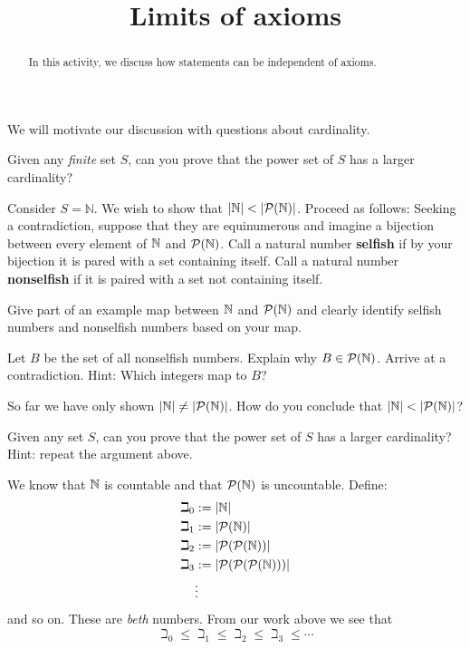 \documentclass[nooutcomes]{ximera}
\title{Limits of axioms}
\begin{document}
\begin{abstract}
In this activity, we discuss how statements can be independent of axioms.
\end{abstract}
\maketitle 

We will motivate our discussion with questions about cardinality.

\begin{question}
Given any \textit{finite} set $S$, can you prove that the power set of
$S$ has a larger cardinality?
\end{question}

Consider $S=\mathbb{N}$. We wish to show that $|\N|<|\P(\N)|$. Proceed as
follows: Seeking a contradiction, suppose that they are equinumerous
and imagine a bijection between every element of $\mathbb N$ and
$\mathcal{P}(\mathbb N)$. Call a natural number \textbf{selfish} if by your bijection
it is pared with a set containing itself. Call a natural number
\textbf{nonselfish} if it is paired with a set not containing itself.

\begin{question}
Give part of an example map between $\mathbb N$ and $\mathcal{P}(\mathbb N)$ and clearly
identify selfish numbers and nonselfish numbers based on your map.
\end{question}

\begin{question}
Let $B$ be the set of all nonselfish numbers. Explain why
$B\in\mathcal{P}(\mathbb N)$. Arrive at a contradiction. Hint: Which
integers map to $B$?
\end{question}


\begin{question}
So far we have only shown $|\mathbb N|\ne|\mathcal{P}(\mathbb N)|$. How do you conclude that
$|\N|<|\P(\N)|$?
\end{question}

\begin{question}
Given any set $S$, can you prove that the power set of $S$ has a
larger cardinality? Hint: repeat the argument above.
\end{question}



We know that $\mathbb N$ is countable and that $\mathcal{P}(\mathbb N)$ is uncountable. Define:
\begin{align*}
\beth_0 &:=|\mathbb N|\\
\beth_1 &:=|\mathcal{P}(\mathbb N)|\\
\beth_2 &:=|\mathcal{P}(\mathcal{P}(\mathbb N))|\\
\beth_3 &:=|\mathcal{P}(\mathcal{P}(\mathcal{P}(\mathbb N)))|\\
        &\vdots
\end{align*}
and so on. These are \textit{beth} numbers. From our work above we see that 
\[
\beth_0 \le \beth_1 \le \beth_2 \le \beth_3 \le \cdots
\]
\end{document}
